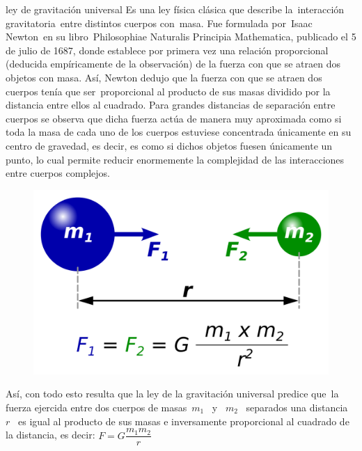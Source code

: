 \newpage %
\begin{myblock}{ley de gravitación universal}
Es una ley física clásica que describe la interacción gravitatoria entre distintos cuerpos con masa. Fue formulada por Isaac Newton en su libro Philosophiae Naturalis Principia Mathematica, publicado el 5 de julio de 1687, donde establece por primera vez una relación proporcional (deducida empíricamente de la observación) de la fuerza con que se atraen dos objetos con masa. Así, Newton dedujo que la fuerza con que se atraen dos cuerpos tenía que ser proporcional al producto de sus masas dividido por la distancia entre ellos al cuadrado. Para grandes distancias de separación entre cuerpos se observa que dicha fuerza actúa de manera muy aproximada como si toda la masa de cada uno de los cuerpos estuviese concentrada únicamente en su centro de gravedad, es decir, es como si dichos objetos fuesen únicamente un punto, lo cual permite reducir enormemente la complejidad de las interacciones entre cuerpos complejos.

\begin{figure}[H]
	\centering
	\includegraphics[width=.75\textwidth]{imagenes/imagenes14/T14IM03.png}
\end{figure}

Así, con todo esto resulta que la ley de la gravitación universal predice que la fuerza ejercida entre dos cuerpos de masas $m_1$  y  $m_2$  separados una distancia $r$  es igual al producto de sus masas e inversamente proporcional al cuadrado de la distancia, es decir:
$F=G\dfrac {m_1m_2}{r}$	
\end{myblock}
